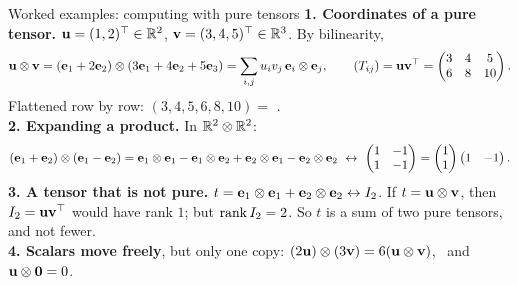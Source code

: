 \documentclass[aspectratio=1610,11pt]{beamer}
\begin{document}
\begin{frame}{Worked examples: computing with pure tensors}
    \small
    \textbf{1. Coordinates of a pure tensor.} $\mathbf{u} = (1, 2)^\top \in \mathbb{R}^2$, $\mathbf{v} = (3, 4, 5)^\top \in \mathbb{R}^3$. By bilinearity,
    \[\mathbf{u} \otimes \mathbf{v} = (\mathbf{e}_1 + 2\mathbf{e}_2) \otimes (3\mathbf{e}_1 + 4\mathbf{e}_2 + 5\mathbf{e}_3) = \sum_{i,j}u_iv_j\,\mathbf{e}_i \otimes \mathbf{e}_j, \qquad (T_{ij}) = \mathbf{u}\mathbf{v}^\top = \begin{pmatrix} 3 & 4 & 5 \\ 6 & 8 & 10 \end{pmatrix}.\]
    Flattened row by row: $(3, 4, 5, 6, 8, 10) = $ .
    \\[0.5em]
    \textbf{2. Expanding a product.} In $\mathbb{R}^2 \otimes \mathbb{R}^2$:
    \[(\mathbf{e}_1 + \mathbf{e}_2) \otimes (\mathbf{e}_1 - \mathbf{e}_2) = \mathbf{e}_1 \otimes \mathbf{e}_1 - \mathbf{e}_1 \otimes \mathbf{e}_2 + \mathbf{e}_2 \otimes \mathbf{e}_1 - \mathbf{e}_2 \otimes \mathbf{e}_2 \ \leftrightarrow\ \begin{pmatrix} 1 & -1 \\ 1 & -1 \end{pmatrix} = \begin{pmatrix} 1 \\ 1 \end{pmatrix}\begin{pmatrix} 1 & -1 \end{pmatrix}.\]
    \textbf{3. A tensor that is not pure.} $t = \mathbf{e}_1 \otimes \mathbf{e}_1 + \mathbf{e}_2 \otimes \mathbf{e}_2 \leftrightarrow I_2$. If $t = \mathbf{u} \otimes \mathbf{v}$, then $I_2 = \mathbf{u}\mathbf{v}^\top$ would have rank $1$; but $\operatorname{rank} I_2 = 2$. So $t$ is a sum of two pure tensors, and not fewer.
    \\[0.5em]
    \textbf{4. Scalars move freely}, but only one copy: $(2\mathbf{u}) \otimes (3\mathbf{v}) = 6(\mathbf{u} \otimes \mathbf{v})$, \ and $\mathbf{u} \otimes \mathbf{0} = 0$.
\end{frame}

\end{document}
